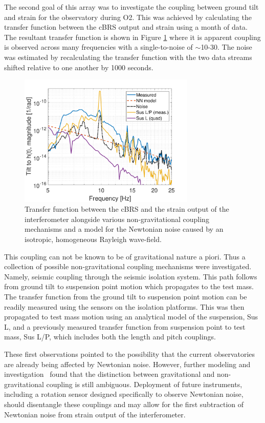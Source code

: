 \documentclass [12pt, proquest]{uwthesis}[2019]
\begin{document}
The second goal of this array was to investigate the coupling between ground tilt and strain for the observatory during O2. This was achieved by calculating the transfer function between the cBRS output and strain using a month of data. The resultant transfer function is shown in Figure \ref{NNCoupling} where it is apparent coupling is observed across many frequencies with a single-to-noise of $\sim$10-30. The noise was estimated by recalculating the transfer function with the two data streams shifted relative to one another by 1000 seconds. 

\begin{figure}[!h]
\begin{center}
\includegraphics[width=0.75\textwidth]{NNCoupling.pdf}
\end{center}
\caption[Transfer function between the cBRS and the strain output of the interferometer]{Transfer function between the cBRS and the strain output of the interferometer alongside various non-gravitational coupling mechanisms and a model for the Newtonian noise caused by an isotropic, homogeneous Rayleigh wave-field.}
\label{NNCoupling}
\end{figure}

This coupling can not be known to be of gravitational nature a piori. Thus a collection of possible non-gravitational coupling mechanisms were investigated.~\cite{NN} Namely, seismic coupling through the seismic isolation system. This path follows from ground tilt to suspension point motion which propagates to the test mass. The transfer function from the ground tilt to suspension point motion can be readily measured using the sensors on the isolation platforms. This was then propagated to test mass motion using an analytical model of the suspension, Sus L, and a previously measured transfer function from suspension point to test mass, Sus L/P, which includes both the length and pitch couplings.

These first observations pointed to the possibility that the current observatories are already being affected by Newtonian noise. However, further modeling and investigation~\cite{NN2} found that the distinction between gravitational and non-gravitational coupling is still ambiguous. Deployment of future instruments, including a rotation sensor designed specifically to observe Newtonian noise, should disentangle these couplings and may allow for the first subtraction of Newtonian noise from strain output of the interferometer.

\printendnotes
\nocite{*}   


\end{document}
